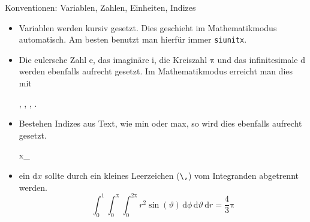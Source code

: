 \begin{frame}[fragile]{Konventionen: Variablen, Zahlen, Einheiten, Indizes}
  \begin{itemize}
    \item Variablen werden kursiv gesetzt.
      Dies geschieht im Mathematikmodus automatisch.
      Am besten benutzt man hierfür immer \texttt{siunitx}.
  \item Die eulersche Zahl $\mathup{e}$, das imaginäre $\mathup{i}$, die Kreiszahl $\mathup{\pi}$ und das infinitesimale $\mathup{d}$ werden ebenfalls aufrecht gesetzt.
      Im Mathematikmodus erreicht man dies mit
      \begin{lstverbatim}
          , , \mathup{\pi}, .
      \end{lstverbatim}
    \item Bestehen Indizes aus Text, wie min oder max, so wird dies ebenfalls aufrecht gesetzt.
      \begin{lstverbatim}
      x_
      \end{lstverbatim}
    \item ein $\mathrm{d}x$ sollte durch ein kleines Leerzeichen (\verb+\,+) vom Integranden abgetrennt werden.
        \begin{equation}
            \int_0^1 \int_0^{\mathup{\pi}} \int_0^{2\mathup{\pi}} r^2 \sin(\vartheta)\, \mathup{d}\phi\, \mathup{d}\vartheta \, \mathup{d}r = \frac{4}{3}\mathup{\pi}
        \end{equation}
  \end{itemize}
\end{frame}
